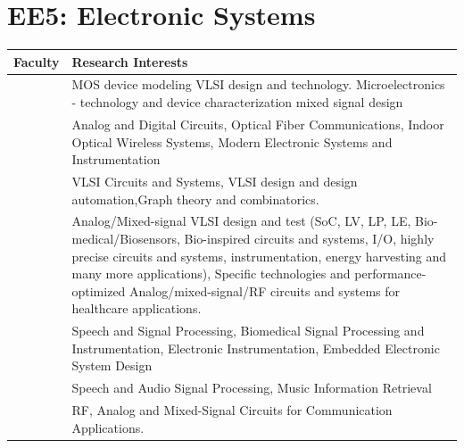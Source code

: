 \documentclass[openany]{book} %
\begin{document}
\section{EE5: Electronic Systems}
\begin{tabular}{p{4.5cm}p{9cm}}

\hline 
\hline 
Faculty & Research Interests \\ 
\hline
\hline


 \href{https://www.ee.iitb.ac.in/wiki/faculty/dinesh}{\color{blue}{Prof. Dinesh K. Sharma}} & MOS device modeling VLSI design and technology. Microelectronics - technology and device characterization mixed signal design \\ 
 \hline 

\href{https://www.ee.iitb.ac.in/wiki/faculty/jjohn}{\color{blue}{Prof. Joseph John}} & Analog and Digital Circuits, Optical Fiber Communications, Indoor Optical Wireless Systems, Modern Electronic Systems and Instrumentation \\ 
\hline 

\href{https://www.ee.iitb.ac.in/~madhav/}{\color{blue}{Prof. Madhav P. Desai}} & VLSI Circuits and Systems, VLSI design and design automation,Graph theory and combinatorics.\\ 
\hline 

 \href{https://www.ee.iitb.ac.in/wiki/faculty/mshojaei}{\color{blue}{Prof. Maryam Shojaei Baghini}} & Analog/Mixed-signal VLSI design and test (SoC, LV, LP, LE, Bio-medical/Biosensors, Bio-inspired circuits and systems, I/O, highly precise circuits and systems, instrumentation, energy harvesting and many more applications), Specific technologies and performance-optimized Analog/mixed-signal/RF circuits and systems for healthcare applications.\\ 
\hline 

\href{https://www.ee.iitb.ac.in/~pcpandey/}{\color{blue}{Prof. Prem C. Pandey}} &  Speech and Signal Processing, Biomedical Signal Processing and Instrumentation, Electronic Instrumentation, Embedded Electronic System Design\\ 
\hline 

 \href{https://www.ee.iitb.ac.in/wiki/faculty/prao}{\color{blue}{Prof. Preeti Rao}} &  Speech and Audio Signal Processing, Music Information Retrieval \\ 
 \hline 

 \href{https://www.ee.iitb.ac.in/web/people/faculty/home/rajeshzele}{\color{blue}{Prof. Rajesh H. Zele }} & RF, Analog and Mixed-Signal Circuits for Communication Applications. \\ 
\hline 


\end{tabular}
\end{document}
